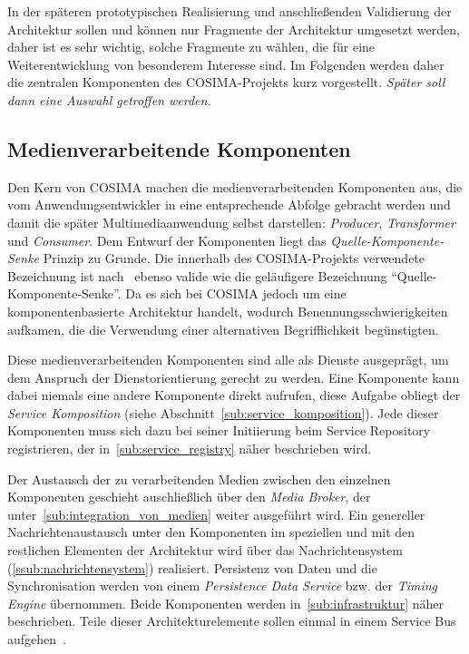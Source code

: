   In der späteren prototypischen Realisierung und anschließenden Validierung der Architektur sollen und können nur Fragmente der Architektur umgesetzt werden, daher ist es sehr wichtig, solche Fragmente zu wählen, die für eine Weiterentwicklung von besonderem Interesse sind. Im Folgenden werden daher die zentralen Komponenten des COSIMA-Projekts kurz vorgestellt. \emph{Später soll dann eine Auswahl getroffen werden.}



\subsection{Medienverarbeitende Komponenten} %
\label{sub:medienverarbeitende_komponenten}

  Den Kern von COSIMA machen die medienverarbeitenden Komponenten aus, die vom Anwendungsentwickler in eine entsprechende Abfolge gebracht werden und damit die später Multimediaanwendung selbst darstellen: \emph{Producer}, \emph{Transformer} und \emph{Consumer}. Dem Entwurf der Komponenten liegt das \emph{Quelle-Komponente-Senke} Prinzip zu Grunde. Die innerhalb des COSIMA-Projekts verwendete Bezeichnung ist nach~\citep{a_multimedia_component_kit,multimedia_component_frameworks} ebenso valide wie die geläufigere Bezeichnung "`Quelle-Komponente-Senke"'. Da es sich bei COSIMA jedoch um eine komponentenbasierte Architektur handelt, wodurch Benennungsschwierigkeiten aufkamen, die die Verwendung einer alternativen Begrifflichkeit begünstigten.
  
  Diese medienverarbeitenden Komponenten sind alle als Dienste ausgeprägt, um dem Anspruch der Dienstorientierung gerecht zu werden. Eine Komponente kann dabei niemals eine andere Komponente direkt aufrufen, diese Aufgabe obliegt der \emph{Service Komposition} (siehe Abschnitt~\ref{sub:service_komposition}). Jede dieser Komponenten muss sich dazu bei seiner Initiierung beim Service Repository registrieren, der in~\ref{sub:service_registry} näher beschrieben wird.
  
  Der Austausch der zu verarbeitenden Medien zwischen den einzelnen Komponenten geschieht auschließlich über den \emph{Media Broker}, der unter~\ref{sub:integration_von_medien} weiter ausgeführt wird. Ein genereller Nachrichtenaustausch unter den Komponenten im speziellen und mit den restlichen Elementen der Architektur wird über das Nachrichtensystem (\ref{ssub:nachrichtensystem}) realisiert. Persistenz von Daten und die Synchronisation werden von einem \emph{Persistence Data Service} bzw. der \emph{Timing Engine} übernommen. Beide Komponenten werden in~\ref{sub:infrastruktur} näher beschrieben. Teile dieser Architekturelemente sollen einmal in einem Service Bus aufgehen~\citep[S. 18]{bericht}.

